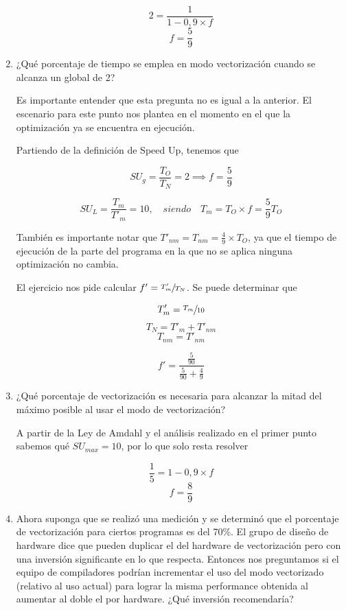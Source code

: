 \begin{enumerate}
 $$ 2 = \frac{1}{1 - 0,9 \times f}$$
 $$ f  = \frac{5}{9} $$
 
 \threeemdash
 \item ¿Qué porcentaje de tiempo se emplea en modo vectorización cuando se alcanza un \SU global de 2?

 Es importante entender que esta pregunta no es igual a la anterior. El escenario para este punto nos plantea en el momento en el que 
 la optimización ya se encuentra en ejecución.

 Partiendo de la definición de Speed Up, tenemos que 

 $$ SU_g = \frac{T_O}{T_N} = 2 \implies f = \frac{5}{9} $$

 $$ SU_L = \frac{T_m}{T'_m} = 10,\quad siendo \quad T_m = T_O \times f = \frac{5}{9}T_O $$

 También es importante notar que $ T'_{nm} = T_{nm} = \frac{4}{9} \times T_O $, ya que el tiempo de ejecución de la parte del 
 programa en la que no se aplica ninguna optimización no cambia.
 
 El ejercicio nos pide calcular $ f' = \sfrac{T'_m}{T_N} $. Se puede determinar que
 
 $$ T'_m =  \sfrac{T_m}{10} $$ 
 $$ T_N = T'_{m} + T'_{nm} $$
 $$ T_{nm} = T'_{nm} $$ 
 
 $$ f' = \frac{\frac{5}{90}}{\frac{5}{90} + \frac{4}{9}} $$
 
 \threeemdash
 \item ¿Qué porcentaje de vectorización es necesaria para alcanzar la mitad del máximo \SU posible al usar el modo de vectorización?

 A partir de la Ley de Amdahl y el análisis realizado en el primer punto sabemos qué $SU_{max} = 10$, por lo que solo resta resolver

 $$ \frac{1}{5} = 1 - 0,9 \times f $$
 $$ f = \frac{8}{9} $$ 
 
 \threeemdash
 \item Ahora suponga que se realizó una medición y se determinó que el porcentaje de vectorización para ciertos programas es del 70\%. El grupo de diseño de hardware dice que pueden duplicar el \SU del hardware de vectorización pero con una inversión significante en lo que respecta. Entonces nos preguntamos si el equipo de compiladores podrían incrementar el uso del modo vectorizado (relativo al uso actual) para lograr la misma performance obtenida al aumentar al doble el \SU por hardware. ¿Qué inversión recomendaría?  

\end{enumerate}


